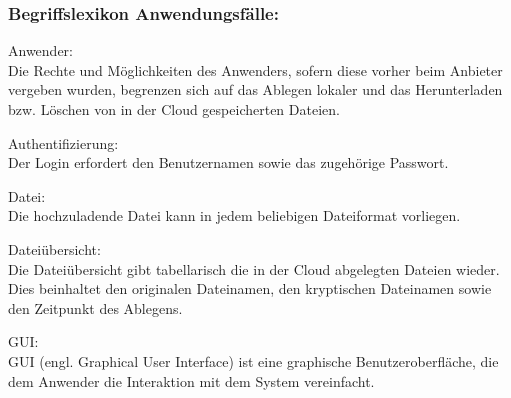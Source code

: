 \documentclass[13pt,a4paper,bibliography=totocnumbered,listof=totocnumbered]{scrartcl}
\begin{document}
\subsubsection{Begriffslexikon Anwendungsfälle:}
\begin{compactitem}
\item Anwender:\\
Die Rechte und Möglichkeiten des Anwenders, sofern diese vorher beim Anbieter vergeben wurden, begrenzen sich auf das Ablegen lokaler und das Herunterladen bzw. Löschen von in der Cloud gespeicherten Dateien.
\item Authentifizierung:\\
Der Login erfordert den Benutzernamen sowie das zugehörige Passwort.
\item Datei:\\
Die hochzuladende Datei kann in jedem beliebigen Dateiformat vorliegen.
\item Dateiübersicht:\\
Die Dateiübersicht gibt tabellarisch die in der Cloud abgelegten Dateien wieder. Dies beinhaltet den originalen Dateinamen, den kryptischen Dateinamen  sowie den Zeitpunkt des Ablegens.
\item GUI:\\
GUI (engl. Graphical User Interface) ist eine graphische Benutzeroberfläche, die dem Anwender die Interaktion mit dem System vereinfacht.
\end{compactitem}
\pagebreak
\end{document}

